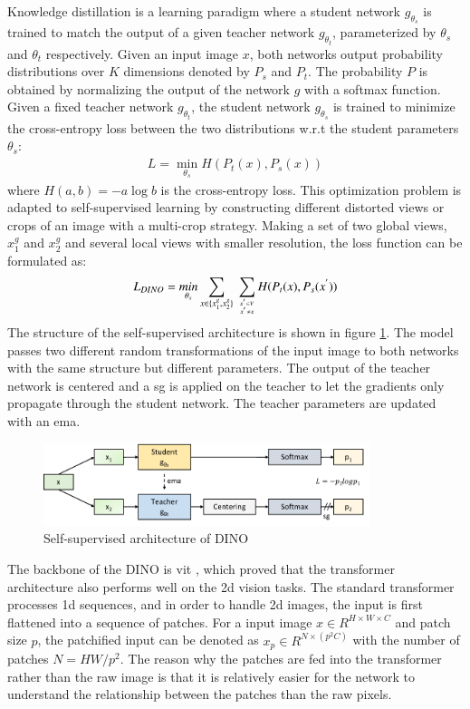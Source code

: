 \documentclass[12pt,DIV14,BCOR12mm,a4paper,footinclude=false,headinclude,parskip=half-,twoside,openright,cleardoublepage=empty,toc=index,bibliography=totoc,listof=totoc]{scrreprt}
\numberwithin{equation}{chapter}
\begin{document}
Knowledge distillation is a learning paradigm where a student network $g_{\theta_{s}}$ is trained to match the output of a given teacher network $g_{\theta_{t}}$, parameterized by $\theta_{s}$ and $\theta_{t}$ respectively. Given an input image $x$, both networks output probability distributions over $K$ dimensions denoted by $P_{s}$ and $P_{t}$. The probability $P$ is obtained by normalizing the output of the network $g$ with a softmax function. Given a fixed teacher network $g_{\theta_{t}}$, the student network $g_{\theta_{s}}$ is trained to minimize the cross-entropy loss between the two distributions w.r.t the student parameters $\theta_{s}$:
\begin{align}
  L = \mathop{min}_{\theta_{s}}H(P_{t}(x), P_{s}(x))
\end{align}
where $H(a,b)=-a \log b$ is the cross-entropy loss. This optimization problem is adapted to self-supervised learning by constructing different distorted views or crops of an image with a multi-crop strategy. Making a set of two global views, $x_{1}^{g}$ and $x_{2}^{g}$ and several local views with smaller resolution, the loss function can be formulated as:
\begin{align}
  L_{DINO}=\mathop{min}_{\theta_{s}}\mathop{\sum}_{x\in \{x_{1}^{g},x_{2}^{g}\}} \ \mathop{\sum}_{x^{'}\in V \atop x^{'}\neq x}H(P_{t}(x), P_{s}(x^{'}))
\end{align}
The structure of the self-supervised architecture is shown in figure \ref{img:dino}. The model passes two different random transformations of the input image to both networks with the same structure but different parameters. The output of the teacher network is centered and a \gls{sg} is applied on the teacher to let the gradients only propagate through the student network. The teacher parameters are updated with an \gls{ema}.
\begin{figure}[h]
	\centering
	\includegraphics[width=0.85\textwidth]{img/dino.pdf}
	\caption{Self-supervised architecture of DINO}
	\label{img:dino}
\end{figure}

The backbone of the DINO is \gls{vit} \cite{dosovitskiy2021image}, which proved that the transformer architecture also performs well on the \gls{2d} vision tasks. The standard transformer processes \gls{1d} sequences, and in order to handle \gls{2d} images, the input is first flattened into a sequence of patches. For a input image $x\in R^{H\times W\times C}$ and patch size $p$, the patchified input can be denoted as $x_p\in R^{N\times(p^{2}C)}$ with the number of patches $N=HW/{p^{2}}$. The reason why the patches are fed into the transformer rather than the raw image is that it is relatively easier for the network to understand the relationship between the patches than the raw pixels.
\end{document}
